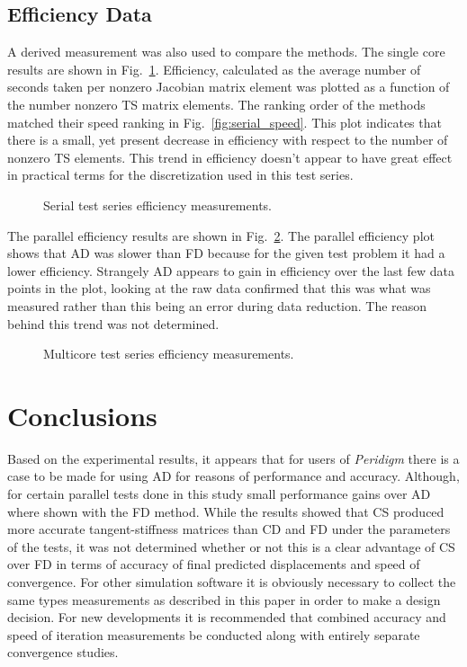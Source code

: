 \documentclass[preprint,12pt]{elsarticle}
\begin{document}
\subsection{Efficiency Data}
A derived measurement was also used to compare the methods. The single core results are shown in Fig.~\ref{fig:serial_efficiency}. Efficiency, calculated as the average number of seconds taken per nonzero Jacobian matrix element was plotted as a function of the number nonzero TS matrix elements. The ranking order of the methods
matched their speed ranking in Fig.~\ref{fig:serial_speed}. This plot indicates that there is a small, yet present decrease in efficiency with respect to the number of nonzero TS elements. This trend in efficiency doesn't appear to have great effect in practical terms for the discretization used in this test series.  
%
\begin{figure}[tbp]
  \centering
  \scalebox{1.0}{}
  \caption{Serial test series efficiency measurements.}
  \label{fig:serial_efficiency}
\end{figure}
%
The parallel efficiency results are shown in Fig.~\ref{fig:multi_efficiency}. The parallel efficiency plot shows that AD was slower than FD because for the given test problem it had a lower efficiency. Strangely AD appears to gain in efficiency over the last few data points in the plot, looking at the raw data confirmed that this was what was measured rather than this being an error during data reduction. The reason behind this trend was not determined.
%
\begin{figure}[tbp]
  \centering
  \scalebox{1.0}{}
  \caption{Multicore test series efficiency measurements.}
  \label{fig:multi_efficiency}
\end{figure}


\section{Conclusions}
%
Based on the experimental results, it appears that for users of \emph{Peridigm} there is a case to be made for using AD for reasons of performance and accuracy. Although, for certain parallel tests done in this study small performance gains over AD where shown with the FD method.  While the results showed that CS produced more accurate tangent-stiffness matrices than CD and FD under the parameters of the tests, it was not determined whether or not this is a clear advantage of CS over FD in terms of accuracy of final predicted displacements and speed of convergence. For other simulation software it is obviously necessary to collect the same types measurements as described in this paper in order to make a design decision. For new developments it is recommended that combined accuracy and speed of iteration measurements be conducted along with entirely separate convergence studies. 
\end{document}
